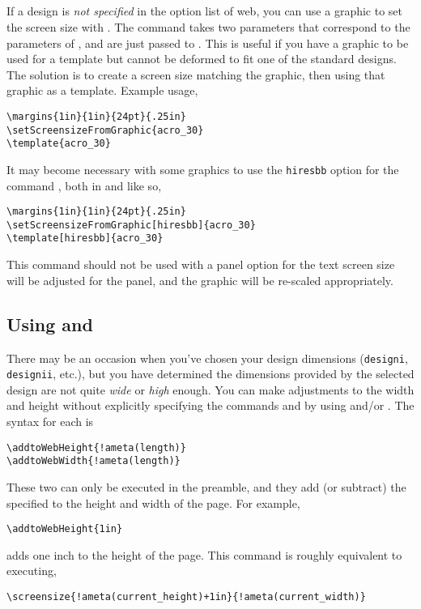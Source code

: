 \documentclass{article}
\def\Web{\textsf{web}}
\edef\amtIndent{\the\parindent}
\def\CMD#1{\textbackslash#1}
\begin{document}
{\subsection{\texorpdfstring{\protect{}}{\CMD{setScreensizeFromGraphic}}}\label{setScreensizeFromGraphic}

If a design is \emph{not specified} in the option list of \Web, you
can use a graphic to set the screen size with
. The command takes two parameters
that correspond to the parameters of , and are
just passed to . This is useful if you have a
graphic to be used for a template but cannot be deformed to fit one
of the standard designs. The solution is to create a screen size
matching the graphic, then using that graphic as a template. Example
usage,
\begin{Verbatim}[xleftmargin=\amtIndent]
\margins{1in}{1in}{24pt}{.25in}
\setScreensizeFromGraphic{acro_30}
\template{acro_30}
\end{Verbatim}
It may become necessary with some graphics to use the
\texttt{hiresbb} option for the command , both in
 and  like so,
\begin{Verbatim}[xleftmargin=\amtIndent]
\margins{1in}{1in}{24pt}{.25in}
\setScreensizeFromGraphic[hiresbb]{acro_30}
\template[hiresbb]{acro_30}
\end{Verbatim}
\newtopic This command should not be used with a panel option for the text screen
size will be adjusted for the panel, and the graphic will be
re-scaled appropriately.

\subsection{Using \texorpdfstring{\protect{} and \protect{}}
{\CMD{addtoWebHeight} and \CMD{addtoWebWidth}}}

There may be an occasion when you've chosen your design dimensions
(\texttt{designi}, \texttt{designii}, etc.), but you have determined the
dimensions provided by the selected design are not quite \emph{wide} or \emph{high} enough.
You can make adjustments to the width and height without explicitly specifying
the commands  and  by using  and/or
. The syntax for each is
\begin{Verbatim}[xleftmargin=\amtIndent,commandchars=!()]
\addtoWebHeight{!ameta(length)}
\addtoWebWidth{!ameta(length)}
\end{Verbatim}
These two can only be executed in the preamble, and they add (or subtract)
the specified  to the height and width of the page. For example,
\begin{Verbatim}[xleftmargin=\amtIndent]
\addtoWebHeight{1in}
\end{Verbatim}
adds one inch to the height of the page. This
command is roughly equivalent to executing,
\begin{Verbatim}[xleftmargin=\amtIndent,commandchars=!()]
\screensize{!ameta(current_height)+1in}{!ameta(current_width)}
\end{Verbatim}


}
\end{document}
